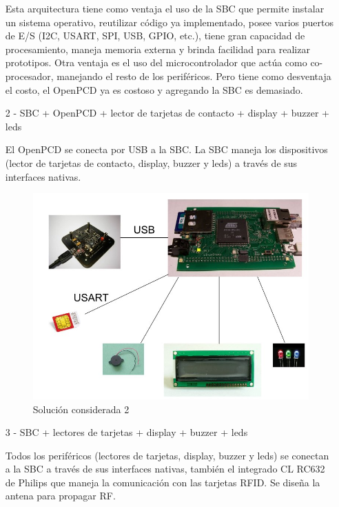 \begin{itemize}
Esta arquitectura tiene como ventaja el uso de la SBC que permite instalar un sistema operativo, reutilizar código ya implementado, posee varios puertos de E/S (I2C, USART, SPI, USB, GPIO, etc.), tiene gran capacidad de procesamiento, maneja memoria externa y brinda facilidad para realizar prototipos. Otra ventaja es el uso del microcontrolador que actúa como co-procesador, manejando el resto de los periféricos. Pero tiene como desventaja el costo, el OpenPCD ya es costoso y agregando la SBC es demasiado.

\item[2 -] SBC + OpenPCD + lector de tarjetas de contacto + display + buzzer + leds
\bigskip

El OpenPCD se conecta por USB a la SBC. La SBC maneja los dispositivos (lector de tarjetas de contacto, display, buzzer y leds) a través de sus interfaces nativas.

\begin{figure}[H]
\centering
  \begin{center}
  \includegraphics[scale=.25]{Imagenes/2.jpg} 
  \end{center}
  \caption{Solución considerada 2}\label{Fig:HW} 
\end{figure}

\newpage

\item[3 -] SBC + lectores de tarjetas + display + buzzer + leds
\bigskip

Todos los periféricos (lectores de tarjetas, display, buzzer y leds) se conectan a la SBC a través de sus interfaces nativas, también el integrado CL RC632 de Philips que maneja la comunicación con las tarjetas RFID. Se diseña la antena para propagar RF.


\end{itemize}
